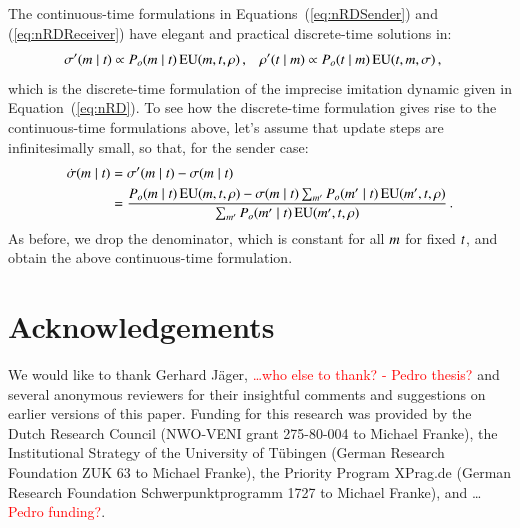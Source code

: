 \documentclass[12pt,english]{article}
\numberwithin{equation}{section}
\begin{document}
\begin{appendices}
The continuous-time formulations in Equations~(\ref{eq:nRDSender}) and (\ref{eq:nRDReceiver})
have elegant and practical discrete-time solutions in:
\begin{align*}
  \sigma'(m \mid t) & \propto P_o(m \mid t) \thinspace \mathrm{EU}(m,
  t, \rho)\,, & \rho'(t \mid m) & \propto P_o(t \mid m)
  \thinspace \mathrm{EU}(t, m, \sigma)\,,
\end{align*}
which is the discrete-time formulation of the imprecise imitation dynamic given in
Equation~(\ref{eq:nRD}). To see how the discrete-time formulation gives rise to the
continuous-time formulations above, let's assume that update steps are infinitesimally small,
so that, for the sender case:
\begin{align*}
  \dot{\sigma}(m \mid t) & = \sigma'(m \mid t) - \sigma(m
  \mid t)\\
  &= \frac{P_o(m \mid t) \thinspace \mathrm{EU}(m, t, \rho) - \sigma(m
    \mid t) \sum_{m'} P_o(m' \mid t) \thinspace \mathrm{EU}(m', t,
    \rho) }{ \sum_{m'} P_o(m' \mid t) \thinspace \mathrm{EU}(m', t,
    \rho)}\,.
\end{align*}
As before, we drop the denominator, which is constant for all $m$ for fixed $t$, and
obtain the above continuous-time formulation.

\end{appendices}

\section*{Acknowledgements}

We would like to thank Gerhard J\"{a}ger, \textcolor{red}{\dots who else to thank? - Pedro
  thesis?} and several anonymous reviewers for their insightful comments and suggestions on
earlier versions of this paper. Funding for this research was provided by the Dutch Research
Council (NWO-VENI grant 275-80-004 to Michael Franke), the Institutional Strategy of the
University of T\"{u}bingen (German Research Foundation ZUK 63 to Michael Franke), the Priority
Program XPrag.de (German Research Foundation Schwerpunktprogramm 1727 to Michael Franke), and
\dots \textcolor{red}{Pedro funding?}.
\end{document}
